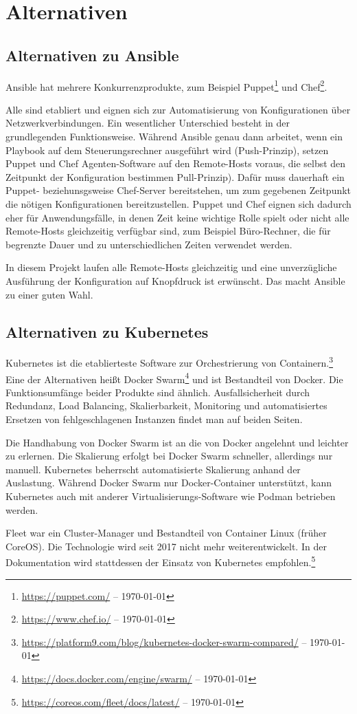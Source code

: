 \chapter{Alternativen}\label{ch:alternativen}
\section{Alternativen zu Ansible}\label{sec:ansible-alternativen}

Ansible hat mehrere Konkurrenzprodukte, zum Beispiel Puppet\footnote{\url{https://puppet.com/} -- \today} und Chef\footnote{\url{https://www.chef.io/} -- \today}.

Alle sind etabliert und eignen sich zur Automatisierung von Konfigurationen über Netzwerkverbindungen.
Ein wesentlicher Unterschied besteht in der grundlegenden Funktionsweise.
Während Ansible genau dann arbeitet, wenn ein Playbook auf dem Steuerungsrechner ausgeführt wird (Push-Prinzip), setzen Puppet und Chef Agenten-Software auf den Remote-Hosts voraus, die selbst den Zeitpunkt der Konfiguration bestimmen Pull-Prinzip).
Dafür muss dauerhaft ein Puppet- beziehunsgsweise Chef-Server bereitstehen, um zum gegebenen Zeitpunkt die nötigen Konfigurationen bereitzustellen.
Puppet und Chef eignen sich dadurch eher für Anwendungsfälle, in denen Zeit keine wichtige Rolle spielt oder nicht alle Remote-Hosts gleichzeitig verfügbar sind, zum Beispiel Büro-Rechner, die für begrenzte Dauer und zu unterschiedlichen Zeiten verwendet werden.

In diesem Projekt laufen alle Remote-Hosts gleichzeitig und eine unverzügliche Ausführung der Konfiguration auf Knopfdruck ist erwünscht.
Das macht Ansible zu einer guten Wahl.

\section{Alternativen zu Kubernetes}\label{sec:kubernetes-alternativen}
Kubernetes ist die etablierteste Software zur Orchestrierung von Containern.\footnote{\url{https://platform9.com/blog/kubernetes-docker-swarm-compared/} -- \today}
Eine der Alternativen heißt Docker Swarm\footnote{\url{https://docs.docker.com/engine/swarm/} -- \today} und ist Bestandteil von Docker.
Die Funktionsumfänge beider Produkte sind ähnlich.
Ausfallsicherheit durch Redundanz, Load Balancing, Skalierbarkeit, Monitoring und automatisiertes Ersetzen von fehlgeschlagenen Instanzen findet man auf beiden Seiten.

Die Handhabung von Docker Swarm ist an die von Docker angelehnt und leichter zu erlernen.
Die Skalierung erfolgt bei Docker Swarm schneller, allerdings nur manuell.
Kubernetes beherrscht automatisierte Skalierung anhand der Auslastung.
Während Docker Swarm nur Docker-Container unterstützt, kann Kubernetes auch mit anderer Virtualisierungs-Software wie Podman betrieben werden.

Fleet war ein Cluster-Manager und Bestandteil von Container Linux (früher CoreOS).
Die Technologie wird seit 2017 nicht mehr weiterentwickelt.
In der Dokumentation wird stattdessen der Einsatz von Kubernetes empfohlen.\footnote{\url{https://coreos.com/fleet/docs/latest/} -- \today}
